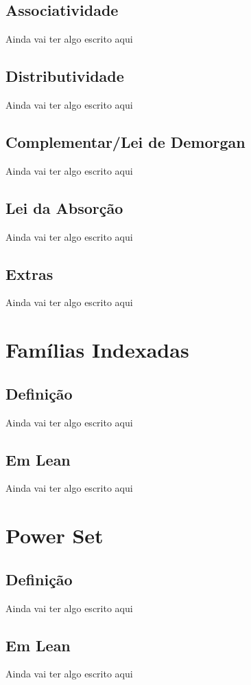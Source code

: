   \subsection{Associatividade}
  Ainda vai ter algo escrito aqui

  \subsection{Distributividade}
  Ainda vai ter algo escrito aqui

  \subsection{Complementar/Lei de Demorgan}
  Ainda vai ter algo escrito aqui

  \subsection{Lei da Absorção}
  Ainda vai ter algo escrito aqui

  \subsection{Extras}
  Ainda vai ter algo escrito aqui

\section{Famílias Indexadas}

  \subsection{Definição}
  Ainda vai ter algo escrito aqui

  \subsection{Em Lean}
  Ainda vai ter algo escrito aqui

\section{Power Set}

  \subsection{Definição}
  Ainda vai ter algo escrito aqui

  \subsection{Em Lean}
  Ainda vai ter algo escrito aqui

